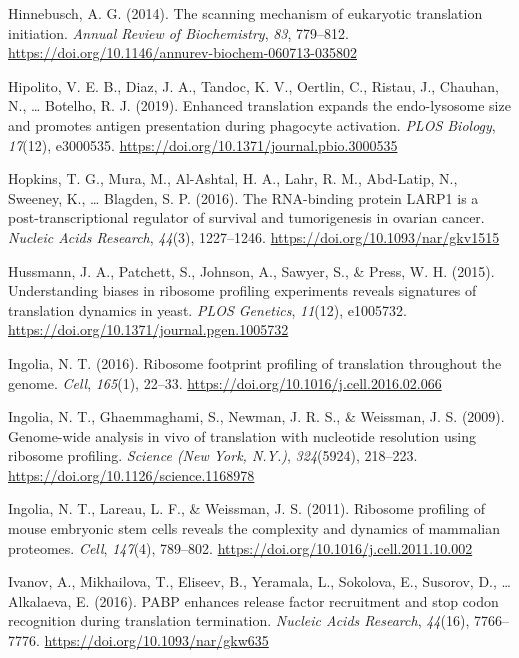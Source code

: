 \documentclass[12pt,openany]{book}
\begin{document}
\hypertarget{ref-Hinnebusch2014}{}
Hinnebusch, A. G. (2014). The scanning mechanism of eukaryotic
translation initiation. \emph{Annual Review of Biochemistry}, \emph{83},
779--812. \url{https://doi.org/10.1146/annurev-biochem-060713-035802}

\hypertarget{ref-Hipolito2019}{}
Hipolito, V. E. B., Diaz, J. A., Tandoc, K. V., Oertlin, C., Ristau, J.,
Chauhan, N., \ldots{} Botelho, R. J. (2019). Enhanced translation
expands the endo-lysosome size and promotes antigen presentation during
phagocyte activation. \emph{PLOS Biology}, \emph{17}(12), e3000535.
\url{https://doi.org/10.1371/journal.pbio.3000535}

\hypertarget{ref-Hopkins2016}{}
Hopkins, T. G., Mura, M., Al-Ashtal, H. A., Lahr, R. M., Abd-Latip, N.,
Sweeney, K., \ldots{} Blagden, S. P. (2016). The RNA-binding protein
LARP1 is a post-transcriptional regulator of survival and tumorigenesis
in ovarian cancer. \emph{Nucleic Acids Research}, \emph{44}(3),
1227--1246. \url{https://doi.org/10.1093/nar/gkv1515}

\hypertarget{ref-Hussmann2015}{}
Hussmann, J. A., Patchett, S., Johnson, A., Sawyer, S., \& Press, W. H.
(2015). Understanding biases in ribosome profiling experiments reveals
signatures of translation dynamics in yeast. \emph{PLOS Genetics},
\emph{11}(12), e1005732.
\url{https://doi.org/10.1371/journal.pgen.1005732}

\hypertarget{ref-Ingolia2016}{}
Ingolia, N. T. (2016). Ribosome footprint profiling of translation
throughout the genome. \emph{Cell}, \emph{165}(1), 22--33.
\url{https://doi.org/10.1016/j.cell.2016.02.066}

\hypertarget{ref-Ingolia2009}{}
Ingolia, N. T., Ghaemmaghami, S., Newman, J. R. S., \& Weissman, J. S.
(2009). Genome-wide analysis in vivo of translation with nucleotide
resolution using ribosome profiling. \emph{Science (New York, N.Y.)},
\emph{324}(5924), 218--223.
\url{https://doi.org/10.1126/science.1168978}

\hypertarget{ref-Ingolia2011}{}
Ingolia, N. T., Lareau, L. F., \& Weissman, J. S. (2011). Ribosome
profiling of mouse embryonic stem cells reveals the complexity and
dynamics of mammalian proteomes. \emph{Cell}, \emph{147}(4), 789--802.
\url{https://doi.org/10.1016/j.cell.2011.10.002}

\hypertarget{ref-Ivanov2016}{}
Ivanov, A., Mikhailova, T., Eliseev, B., Yeramala, L., Sokolova, E.,
Susorov, D., \ldots{} Alkalaeva, E. (2016). PABP enhances release factor
recruitment and stop codon recognition during translation termination.
\emph{Nucleic Acids Research}, \emph{44}(16), 7766--7776.
\url{https://doi.org/10.1093/nar/gkw635}
\end{document}
